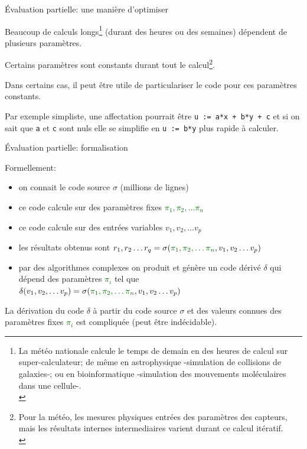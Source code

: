 \documentclass[final,a4,xcolor={svgnames,dvipsnames}]{beamer}
\begin{document}
 \begin{frame}{Évaluation partielle: une manière d'optimiser}

Beaucoup de calculs longs\footnote{La météo nationale calcule le temps
de demain en des heures de calcul sur super-calculateur; de même en
astrophysique -simulation de collisions de galaxies-; ou en
bioinformatique -simulation des mouvements moléculaires dans une
cellule-.\\} (durant des heures ou des semaines) dépendent de plusieurs
paramètres.
\medskip

Certains paramètres sont constants durant tout le calcul\footnote{Pour
la météo, les mesures physiques entrées des paramètres des capteurs,
mais les résultats internes intermediaires varient durant ce calcul
itératif.\\}.
\medskip

Dans certains cas, il peut être utile de particulariser le code pour ces paramètres constants.

Par exemple simpliste, une affectation pourrait être \texttt{u := a*x
  + b*y + c} et si on sait que \texttt{a} et \texttt{c} sont nuls elle
se simplifie en \texttt{u := b*y} plus rapide à calculer.


 \end{frame}

 \begin{frame}{Évaluation partielle: formalisation}
   
Formellement:

\begin{itemize}
\item on connait le code source $\sigma$ (millions de lignes)
\item ce code calcule sur des paramètres fixes \textcolor{DarkGreen}{$\pi_1, \pi_2, \ldots \pi_n$}
\item ce code calcule sur des entrées variables $v_1, v_2, \ldots v_p$
  
\item les résultats obtenus sont $r_1, r_2 \ldots r_q = \sigma (\textcolor{DarkGreen}{\pi_1, \pi_2, \ldots \pi_n}, v_1, v_2 \ldots v_p)$
\item par des algorithmes complexes on produit et génère un code
  dérivé $\delta$ qui dépend des paramètres \textcolor{DarkGreen}{$\pi_i$} tel que
  $\delta(v_1, v_2, \ldots v_p) = \sigma(\color{DarkGreen}{\pi_1, \pi_2, \ldots \pi_n}\color{black}{,  v_1, v_2 \ldots v_p)}$
\end{itemize}

La dérivation du code $\delta$ à partir du code source $\sigma$ et des
valeurs connues des paramètres fixes \textcolor{DarkGreen}{$\pi_i$}
est compliquée (peut être indécidable).
 \end{frame}
\end{document}
